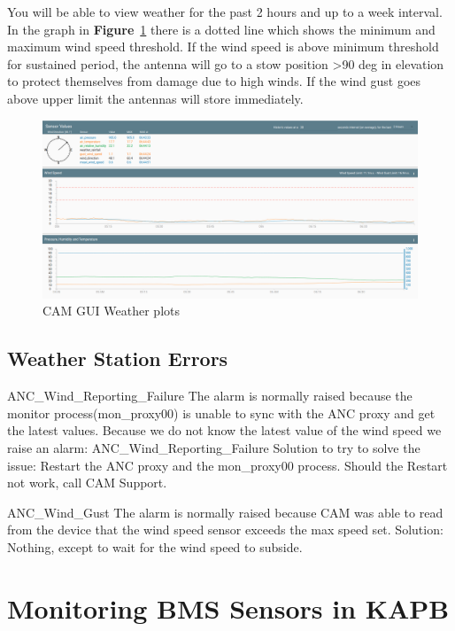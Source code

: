 You will be able to view weather for the past 2 hours and up to a week interval. In the graph in \textbf{Figure}~\ref{fig:image56} there is a dotted line which shows the minimum and maximum wind speed threshold. If the wind speed is above minimum threshold for sustained period, the antenna will go to a stow position >90 deg in elevation to protect themselves from damage due to high winds.  If the wind gust goes above upper limit the antennas will store immediately.



\begin{figure}[!thb]
	\centering
	\includegraphics[scale=0.23]{Chapters/images/image56.png}
	
	\caption{CAM GUI Weather plots}
	\label{fig:image56}
\end{figure}

\subsection{ Weather Station Errors}
ANC\_Wind\_Reporting\_Failure
The alarm is normally raised because the monitor process(mon\_proxy00) is unable to sync with the ANC proxy and get the latest values. Because we do not know the latest value of the wind speed we raise an alarm: ANC\_Wind\_Reporting\_Failure
Solution to try to solve the issue: Restart the ANC proxy and the mon\_proxy00 process. Should the Restart not work, call CAM Support.

ANC\_Wind\_Gust
The alarm is normally raised because CAM was able to read from the device that the wind speed sensor exceeds the max speed set.
Solution: Nothing, except to wait for the wind speed to subside.




\section{ Monitoring BMS Sensors in KAPB}
